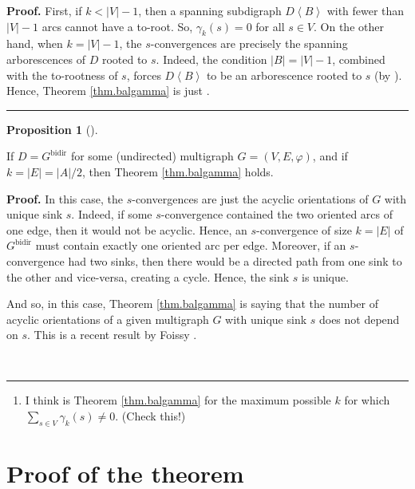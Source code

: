 \documentclass[numbers=enddot,12pt,final,onecolumn,notitlepage]{scrartcl}%
\theoremstyle{definition}
\newtheorem{prop}[theo]{Proposition}
\newenvironment{proposition}[1][]
{\begin{prop}[#1]\begin{leftbar}}
{\end{leftbar}\end{prop}}
\newenvironment{proof}[1][Proof]{\noindent\textbf{#1.} }{\ \rule{0.5em}{0.5em}}
\let\sumnonlimits\sum
\renewcommand{\sum}{\sumnonlimits\limits}
\theoremstyle{plainsl}
\begin{document}
\begin{proof}
    First, if $k < |V|-1$, then a spanning subdigraph $D\left\langle
B\right\rangle $ with fewer than $\left\vert V\right\vert -1$ arcs cannot have a to-root. So, $\gamma_{k}(s) = 0$ for all $s \in V$. On the other hand, when $k=\left\vert V\right\vert -1$, the $s$-convergences are precisely
the spanning arborescences of $D$ rooted to $s$. Indeed, the condition
$\left\vert B\right\vert =\left\vert V\right\vert -1$, combined with the
to-rootness of $s$, forces $D\left\langle B\right\rangle $ to be an
arborescence rooted to $s$ (by \cite[Theorem 5.10.5]{22s}). Hence, Theorem \ref{thm.balgamma} is just
\cite[Corollary 5.12.1]{22s}. \end{proof}

\begin{proposition}
    If $D=G^{\operatorname*{bidir}}$ for some (undirected) multigraph
$G=\left(  V,E,\varphi\right)  $, and if $k=\left\vert E\right\vert
=\left\vert A\right\vert /2$, then Theorem \ref{thm.balgamma} holds.
\end{proposition}

\begin{proof}
    In this case, the $s$-convergences are just the acyclic orientations of $G$ with unique sink $s$. Indeed, if some $s$-convergence contained the two oriented arcs of one edge, then it would not be acyclic. Hence, an $s$-convergence of size $k = |E|$ of $G^{\operatorname*{bidir}}$ must contain exactly one oriented arc per edge. Moreover, if an $s$-convergence had two sinks, then there would be a directed path from one sink to the other and vice-versa, creating a cycle. Hence, the sink $s$ is unique.

    And so, in this case, Theorem \ref{thm.balgamma} is saying that the number of acyclic orientations of a
    given multigraph $G$ with unique sink $s$ does not depend on $s$. This is a
    recent result by Foissy \cite[Proposition 4.6]{Foissy22}.
    
\end{proof}

\begin{enumerate}

\item I think \cite[Proposition 3.7]{PerPha15} is Theorem \ref{thm.balgamma}
for the maximum possible $k$ for which $\sum_{s\in V}\gamma_{k}\left(
s\right)  \neq0$. (Check this!)
\end{enumerate}

\section{Proof of the theorem}
\end{document}
